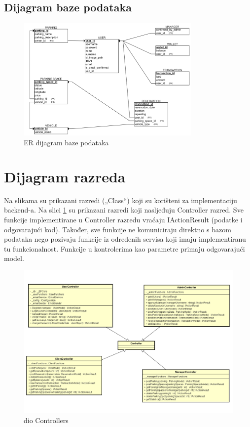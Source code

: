 		
		
		\subsection{Dijagram baze podataka}
		
		\begin{figure}[h]
			\centering
			\includegraphics[width=0.8\textwidth]{baza-slika}
			\caption{ER dijagram baze podataka}
		\end{figure}
			
			
		\section{Dijagram razreda} 
			
			{ Na slikama su prikazani razredi („Class“) koji su korišteni za implementaciju backend-a. Na slici \ref{fig:controllers} su prikazani razredi koji nasljeđuju Controller razred. Sve funkcije implementirane u Controller razredu vraćaju IActionResult (podatke i odgovarajući kod). Također, sve funkcije ne komuniciraju direktno s bazom podataka nego pozivaju funkcije iz određenih servisa koji imaju implementiranu tu funkcionalnost. Funkcije u kontrolerima kao parametre primaju odgovarajući model. }
			
			\begin{figure}[h]
				\centering
				\includegraphics[width=\textwidth,keepaspectratio]{slike/progi4_1.png}
				\caption{dio Controllers}
				\label{fig:controllers}
			\end{figure}
			\pagebreak
			
